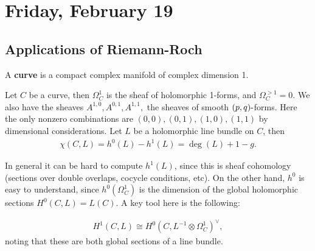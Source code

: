 \hypertarget{friday-february-19}{%
\section{Friday, February 19}\label{friday-february-19}}

\hypertarget{applications-of-riemann-roch}{%
\subsection{Applications of
Riemann-Roch}\label{applications-of-riemann-roch}}

\begin{definition}[Curves]

A \textbf{curve} is a compact complex manifold of complex dimension 1.

\end{definition}

\begin{example}[?]

Let \(C\) be a curve, then \(\Omega_C^1\) is the sheaf of holomorphic
1-forms, and \(\Omega_C^{>1} = 0\). We also have the sheaves
\(A^{1, 0}, A^{0, 1}, A^{1, 1},\) the sheaves of smooth
\((p, q){\hbox{-}}\)forms. Here the only nonzero combinations are
\((0, 0), (0, 1), (1, 0), (1, 1)\) by dimensional considerations. Let
\(L\) be a holomorphic line bundle on \(C\), then
\begin{align*} \chi(C, L) = h^0(L) - h^1(L) = \deg(L) + 1 - g .\end{align*}

\end{example}

\begin{remark}

In general it can be hard to compute \(h^1(L)\), since this is sheaf
cohomology (sections over double overlaps, cocycle conditions, etc). On
the other hand, \(h^0\) is easy to understand, since
\(h^0( \Omega^1_C)\) is the dimension of the global holomorphic sections
\(H^0(C, L) = L(C)\). A key tool here is the following:

\end{remark}

\begin{proposition}

\begin{align*}
H^1(C, L) \cong H^0(C, L ^{-1} \otimes\Omega_C^1)^\vee
,\end{align*}
noting that these are both global sections of a line bundle.

\end{proposition}

